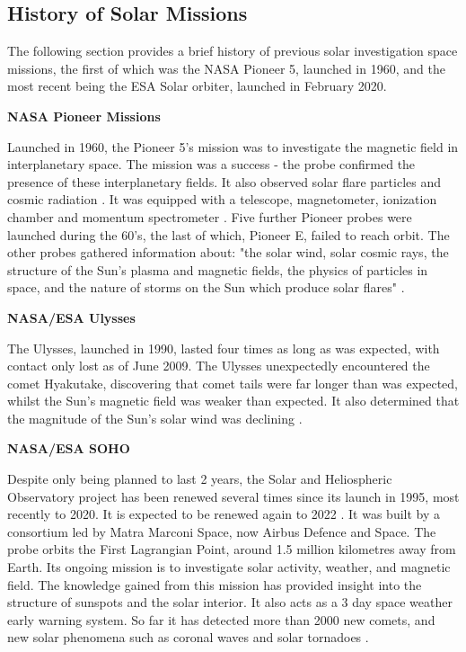 \documentclass[12pt]{article}
\begin{document}
\subsection{History of Solar Missions}

The following section provides a brief history of previous solar investigation space missions, the first of which was the NASA Pioneer 5, launched in 1960, and the most recent being the ESA Solar orbiter, launched in February 2020. 

\vspace{\baselineskip}
\textbf{NASA Pioneer Missions}
\vspace{\baselineskip}

Launched in 1960, the Pioneer 5's mission was to investigate the magnetic field in interplanetary space. The mission was a success - the probe confirmed the presence of these interplanetary fields. It also observed solar flare particles and cosmic radiation \cite{pioneer5}. It was equipped with a telescope, magnetometer, ionization chamber and momentum spectrometer \cite{pioneerinstruments}. Five further Pioneer probes were launched during the 60's, the last of which, Pioneer E, failed to reach orbit. The other probes gathered information about: "the solar wind, solar cosmic rays, the structure of the Sun's plasma and magnetic fields, the physics of particles in space, and the nature of storms on the Sun which produce solar flares" \cite{pioneers}.

\vspace{\baselineskip}
\textbf{NASA/ESA Ulysses}
\vspace{\baselineskip}

The Ulysses, launched in 1990, lasted four times as long as was expected, with contact only lost as of June 2009. The Ulysses unexpectedly encountered the comet Hyakutake, discovering that comet tails were far longer than was expected, whilst the Sun's magnetic field was weaker than expected. It also determined that the magnitude of the Sun's solar wind was declining \cite{ulysses}. 

\vspace{\baselineskip}
\textbf{NASA/ESA SOHO}
\vspace{\baselineskip}

Despite only being planned to last 2 years, the Solar and Heliospheric Observatory project has been renewed several times since its launch in 1995, most recently to 2020. It is expected to be renewed again to 2022 \cite{sohoextension}. It was built by a consortium led by Matra Marconi Space, now Airbus Defence and Space. The probe orbits the First Lagrangian Point, around 1.5 million kilometres away from Earth. Its ongoing mission is to investigate solar activity, weather, and magnetic field. The knowledge gained from this mission has provided insight into the structure of sunspots and the solar interior. It also acts as a 3 day space weather early warning system. So far it has detected more than 2000 new comets, and new solar phenomena such as coronal waves and solar tornadoes \cite{soho}.
\end{document}
